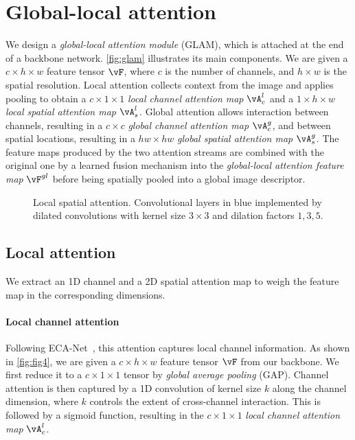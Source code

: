 \section{Global-local attention}
\label{sec:method}

We design a \emph{global-local attention module} (GLAM), which is attached at the end of a backbone network. \autoref{fig:glam} illustrates its main components. We are given a $c\times h \times w$ feature tensor $\vF$, where $c$ is the number of channels, and $h \times w$ is the spatial resolution. Local attention collects context from the image and applies pooling to obtain a $c \times 1 \times 1$ \emph{local channel attention map} $\vA_c^l$ and a $1 \times h \times w$ \emph{local spatial attention map} $\vA_s^l$. Global attention allows interaction between channels, resulting in a $c \times c$ \emph{global channel attention map} $\vA_c^g$, and between spatial locations, resulting in a $hw \times hw$ \emph{global spatial attention map} $\vA_s^g$. The feature maps produced by the two attention streams are combined with the original one by a learned fusion mechanism into the \emph{global-local attention feature map} $\vF^{gl}$ before being spatially pooled into a global image descriptor.

\begin{figure}
\centering

\caption{Local spatial attention. Convolutional layers in blue implemented by dilated convolutions with kernel size $3 \times 3$ and dilation factors $1,3,5$.}
\label{fig:fig3}
\end{figure}

\subsection{Local attention}
\label{sec:local}

We extract an 1D channel and a 2D spatial attention map to weigh the feature map in the corresponding dimensions.

\paragraph{Local channel attention}

Following ECA-Net~\cite{wang01}, this attention captures local channel information. As shown in \autoref{fig:fig4}, we are given a $c\times h\times w$ feature tensor $\vF$ from our backbone. We first reduce it to a $c \times 1 \times 1$ tensor by \emph{global average pooling} (GAP). Channel attention is then captured by a 1D convolution of kernel size $k$ along the channel dimension, where $k$ controls the extent of cross-channel interaction. This is followed by a sigmoid function, resulting in the $c\times 1\times 1$ \emph{local channel attention map} $\vA_c^l$.

